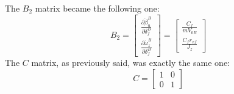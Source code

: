 The $B_{2}$ matrix became the following one:
\begin{equation}
B_{2}=
\begin{bmatrix}
\frac{\partial\dot{\beta}_{u}^{B}}{\partial\delta_{f}^{B}} \\
\frac{\partial\dot{\omega}_{z}^{B}}{\partial\delta_{f}^{B}}
\end{bmatrix} =
\begin{bmatrix}
\frac{C_{f}}{m V_{0B}} \\ \frac{C_{f}r_{xf}}{J_{z}}
\end{bmatrix}
\end{equation}
The $C$ matrix, as previously said, was exactly the same one:
\begin{equation}
C =
\begin{bmatrix}
1 & 0 \\
0 & 1
\end{bmatrix}
\end{equation}
